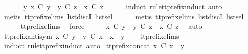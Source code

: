 \ {\isacharminus}\isanewline
\ \ \isamarkupfalse%
\ {\isachardoublequoteopen}{\isasymexists}\ y{\isachardot}\ x\ {\isasymle}\isactrlsub C\ y\ {\isasymand}\ y\ {\isasymle}\isactrlsub C\ z\ {\isasymLongrightarrow}\ x\ {\isasymle}\isactrlsub C\ z{\isachardoublequoteclose}\isanewline
\ \ \ \ \isamarkupfalse%
\ {\isacharparenleft}induct\ rule{\isacharcolon}tt{\isacharunderscore}prefix{\isachardot}induct{\isacharcomma}\ auto{\isacharparenright}\isanewline
\ \ \ \ \isamarkupfalse%
\ {\isacharparenleft}metis\ tt{\isacharunderscore}prefix{\isachardot}elims{\isacharparenleft}{}{\isacharparenright}\ list{\isachardot}discI\ list{\isachardot}sel{\isacharparenleft}{}{\isacharparenright}{\isacharparenright}\isanewline
\ \ \ \ \isamarkupfalse%
\ {\isacharparenleft}metis\ tt{\isacharunderscore}prefix{\isachardot}elims{\isacharparenleft}{}{\isacharparenright}\ list{\isachardot}discI\ list{\isachardot}sel{\isacharparenleft}{}{\isacharparenright}{\isacharparenright}\isanewline
\ \ \ \ \isamarkupfalse%
\ tt{\isacharunderscore}prefix{\isachardot}elims{\isacharparenleft}{}{\isacharparenright}\ \isamarkupfalse%
\ force\isanewline
\ \ \isamarkupfalse%
\ \isamarkupfalse%
\ {\isachardoublequoteopen}x\ {\isasymle}\isactrlsub C\ y\ {\isasymLongrightarrow}\ y\ {\isasymle}\isactrlsub C\ z\ {\isasymLongrightarrow}\ x\ {\isasymle}\isactrlsub C\ z{\isachardoublequoteclose}\ \isamarkupfalse%
\ auto\isanewline
{}\isamarkupfalse%
%
\endisatagproof
{\isafoldproof}%
%
\isadelimproof
\isanewline
%
\endisadelimproof
\isanewline
{}\isamarkupfalse%
\ tt{\isacharunderscore}prefix{\isacharunderscore}antisym{\isacharcolon}\ {\isachardoublequoteopen}x\ {\isasymle}\isactrlsub C\ y\ {\isasymLongrightarrow}\ y\ {\isasymle}\isactrlsub C\ x\ {\isasymLongrightarrow}\ x\ {\isacharequal}\ y{\isachardoublequoteclose}\isanewline
%
\isadelimproof
\ \ %
\endisadelimproof
%
\isatagproof
{}\isamarkupfalse%
\ tt{\isacharunderscore}prefix{\isachardot}elims{\isacharparenleft}{}{\isacharparenright}\ \isamarkupfalse%
\ {\isacharparenleft}induct\ rule{\isacharcolon}tt{\isacharunderscore}prefix{\isachardot}induct{\isacharcomma}\ auto{\isacharparenright}%
\endisatagproof
{\isafoldproof}%
%
\isadelimproof
\isanewline
%
\endisadelimproof
\isanewline
{}\isamarkupfalse%
\ tt{\isacharunderscore}prefix{\isacharunderscore}concat{\isacharcolon}\ {\isachardoublequoteopen}x\ {\isasymle}\isactrlsub C\ x\ {\isacharat}\ y{\isachardoublequoteclose}\isanewline
